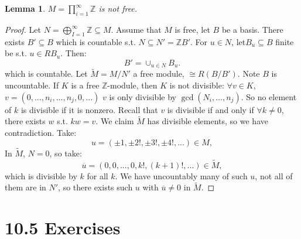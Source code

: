 \documentclass[9pt,reqno,twoside]{amsbook}
\theoremstyle{plain}
\numberwithin{section}{chapter}
\numberwithin{equation}{chapter}
\newtheorem{lem}[theorem]{Lemma}
\theoremstyle{definition}
\theoremstyle{remark}
\theoremstyle{plain}
\newcommand{\sub}{\subseteq}
\newcommand{\z}{\mathbb{Z}}
\renewcommand{\bar}{\overline}%
\begin{document}
\begin{lem}
$M = \prod_{i = 1}^\infty \z$ is not free. 
\end{lem}

\begin{proof}
Let $N = \bigoplus_{I = 1}^\infty \z \sub M$. Assume that $M$ is free, let $B$ be a basis. There exists $B' \sub B$ which is countable s.t. $N \sub N' = \z B'$. For $u \in N$, let$B_u \sub B$ finite be s.t. $u \in RB_u$. Then:
$$
B' = \cup_{u \in N}B_u.
$$
which is countable. Let $\tilde{M} = M/N'$ a free module, $\cong R(B/B')$. Note $B$ is uncountable. If $K$ is a free $\z$-module, then $K$ is not divisible: 
$\forall v \in K$, $v = (0,...,n_i,...,n_j,0,...)$ $v$ is only divisible by $\gcd(N_i,...,n_j)$. So no element of $k$ is divisible if it is nonzero. Recall that $v$ is divisible if and only if $\forall k \neq 0$, there exists $w$ s.t. $kw = v$. We claim $\tilde{M}$ has divisible elements, so we have contradiction. Take:
$$
u = (\pm 1,\pm 2!,\pm 3!,\pm 4!,...) \in M,
$$
In $\tilde{M}$, $N = 0$, so take:
$$
\bar{u} = (0,0,...,0,k!,(k + 1)!,...) \in \tilde{M},
$$
 which is divisible by $k$ for all $k$. We have uncountably many of such $u$, not all of them are in $N'$, so there exists such $u$ with $\bar{u} \neq 0$ in $\tilde{M}$. 
\end{proof}


















\section*{10.5 Exercises}
\end{document}
